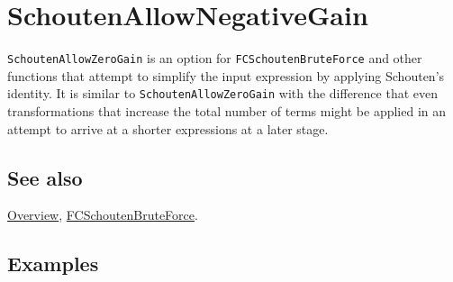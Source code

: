 \documentclass[../FeynCalcManual.tex]{subfiles}
\begin{document}
\hypertarget{schoutenallownegativegain}{%
\section{SchoutenAllowNegativeGain}\label{schoutenallownegativegain}}

\texttt{SchoutenAllowZeroGain} is an option for
\texttt{FCSchoutenBruteForce} and other functions that attempt to
simplify the input expression by applying Schouten's identity. It is
similar to \texttt{SchoutenAllowZeroGain} with the difference that even
transformations that increase the total number of terms might be applied
in an attempt to arrive at a shorter expressions at a later stage.

\subsection{See also}

\hyperlink{toc}{Overview},
\hyperlink{fcschoutenbruteforce}{FCSchoutenBruteForce}.

\subsection{Examples}
\end{document}
